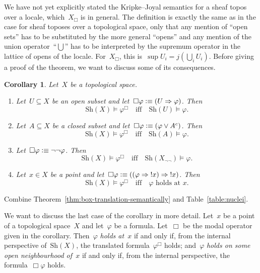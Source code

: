 \documentclass[10pt,reqno,a4paper]{amsbook}
\makeatletter
\theoremstyle{definition}
\theoremstyle{plain}
\newtheorem{cor}[defn]{Corollary}
\theoremstyle{remark}
\newcommand{\Sh}{\mathrm{Sh}}
\newcommand{\?}{\,{:}\,}
\renewcommand{\_}{\mathpunct{.}\,}
\newcommand{\notat}[1]{{!#1}}
\newcommand{\defequiv}{\vcentcolon\equiv}
\renewenvironment{proof}[1][\proofname]{\par
  \pushQED{\qed}%
  \normalfont \topsep6\p@\@plus6\p@\relax
  \trivlist
  \item[\hskip\labelsep
        \itshape
    #1\@addpunct{.}]\ignorespaces
}{%
  \popQED\endtrivlist\@endpefalse
}
\makeatother
\begin{document}
We have not yet explicitly stated the Kripke--Joyal semantics for a sheaf topos
over a locale, which~$X_\Box$ is in general. The definition is exactly the same
as in the case for sheaf toposes over a topological space, only that any
mention of ``open sets'' has to be substituted by the more general ``opens''
and any mention of the union operator~``$\bigcup$'' has to be interpreted by
the supremum operator in the lattice of opens of the locale. For~$X_\Box$, this
is~$\sup U_i = j(\bigcup_i U_i)$. Before giving a proof of the theorem, we want
to discuss some of its consequences.

\begin{cor}\label{cor:spreading}
Let~$X$ be a topological space.
\begin{enumerate}
\item Let~$U \subseteq X$ be an open subset and let~$\Box\varphi \defequiv (U
\Rightarrow \varphi)$. Then
\[ \Sh(X) \models \varphi^\Box \quad\text{iff}\quad \Sh(U) \models \varphi. \]
\item Let~$A \subseteq X$ be a closed subset and let~$\Box\varphi \defequiv
(\varphi \vee A^c)$. Then
\[ \Sh(X) \models \varphi^\Box \quad\text{iff}\quad \Sh(A) \models \varphi. \]
\item Let~$\Box\varphi \defequiv \neg\neg\varphi$. Then
\[ \Sh(X) \models \varphi^\Box \quad\text{iff}\quad \Sh(X_{\neg\neg}) \models \varphi. \]
\item Let~$x \in X$ be a point and let~$\Box\varphi \defequiv ((\varphi
\Rightarrow \notat{x}) \Rightarrow \notat{x})$. Then
\[ \Sh(X) \models \varphi^\Box \quad\text{iff}\quad \text{$\varphi$ holds
at~$x$}. \]
\end{enumerate}
\end{cor}
\begin{proof}Combine Theorem~\ref{thm:box-translation-semantically} and
Table~\ref{table:nuclei}.\end{proof}

We want to discuss the last case of the corollary in more detail. Let~$x$ be a
point of a topological space~$X$ and let~$\varphi$ be a formula. Let~$\Box$ be
the modal operator given in the corollary. Then~$\varphi$ \emph{holds at~$x$}
if and only if, from the internal perspective of~$\Sh(X)$, the translated
formula~$\varphi^\Box$ holds; and~$\varphi$ \emph{holds on some open
neighbourhood of~$x$} if and only if, from the internal perspective, the
formula~$\Box\varphi$ holds.
\end{document}
